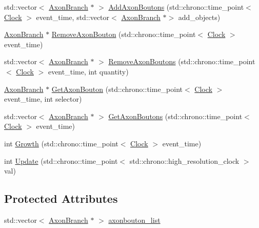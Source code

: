 \begin{DoxyCompactItemize}
\item 
std\+::vector$<$ \mbox{\hyperlink{classAxonBranch}{Axon\+Branch}} $\ast$ $>$ \mbox{\hyperlink{classAxonBranch_a788ca8cc7e6f60f07b9e19a8e3022b64}{Add\+Axon\+Boutons}} (std\+::chrono\+::time\+\_\+point$<$ \mbox{\hyperlink{universe_8h_a0ef8d951d1ca5ab3cfaf7ab4c7a6fd80}{Clock}} $>$ event\+\_\+time, std\+::vector$<$ \mbox{\hyperlink{classAxonBranch}{Axon\+Branch}} $\ast$$>$ add\+\_\+objects)
\item 
\mbox{\hyperlink{classAxonBranch}{Axon\+Branch}} $\ast$ \mbox{\hyperlink{classAxonBranch_a06753a2a61941a59d86510e51ba44b15}{Remove\+Axon\+Bouton}} (std\+::chrono\+::time\+\_\+point$<$ \mbox{\hyperlink{universe_8h_a0ef8d951d1ca5ab3cfaf7ab4c7a6fd80}{Clock}} $>$ event\+\_\+time)
\item 
std\+::vector$<$ \mbox{\hyperlink{classAxonBranch}{Axon\+Branch}} $\ast$ $>$ \mbox{\hyperlink{classAxonBranch_a815e055e37f89fb2627b250c5b95d406}{Remove\+Axon\+Boutons}} (std\+::chrono\+::time\+\_\+point$<$ \mbox{\hyperlink{universe_8h_a0ef8d951d1ca5ab3cfaf7ab4c7a6fd80}{Clock}} $>$ event\+\_\+time, int quantity)
\item 
\mbox{\hyperlink{classAxonBranch}{Axon\+Branch}} $\ast$ \mbox{\hyperlink{classAxonBranch_a6fa6eea91e72fd142f3d691f7ca4c99a}{Get\+Axon\+Bouton}} (std\+::chrono\+::time\+\_\+point$<$ \mbox{\hyperlink{universe_8h_a0ef8d951d1ca5ab3cfaf7ab4c7a6fd80}{Clock}} $>$ event\+\_\+time, int selector)
\item 
std\+::vector$<$ \mbox{\hyperlink{classAxonBranch}{Axon\+Branch}} $\ast$ $>$ \mbox{\hyperlink{classAxonBranch_aafadba57924686a8087c7f7758889045}{Get\+Axon\+Boutons}} (std\+::chrono\+::time\+\_\+point$<$ \mbox{\hyperlink{universe_8h_a0ef8d951d1ca5ab3cfaf7ab4c7a6fd80}{Clock}} $>$ event\+\_\+time)
\item 
int \mbox{\hyperlink{classAxonBranch_a6e434a57873ab0fdbc72cf7ecc7228ed}{Growth}} (std\+::chrono\+::time\+\_\+point$<$ \mbox{\hyperlink{universe_8h_a0ef8d951d1ca5ab3cfaf7ab4c7a6fd80}{Clock}} $>$ event\+\_\+time)
\item 
int \mbox{\hyperlink{classAxonBranch_a5a80bcccdc2be9f77fca25131937b52f}{Update}} (std\+::chrono\+::time\+\_\+point$<$ std\+::chrono\+::high\+\_\+resolution\+\_\+clock $>$ val)
\end{DoxyCompactItemize}
\subsection*{Protected Attributes}
\begin{DoxyCompactItemize}
\item 
std\+::vector$<$ \mbox{\hyperlink{classAxonBranch}{Axon\+Branch}} $\ast$ $>$ \mbox{\hyperlink{classAxonBranch_a43224f9fcb62274709438c9833cb10e5}{axonbouton\+\_\+list}}
\end{DoxyCompactItemize}
